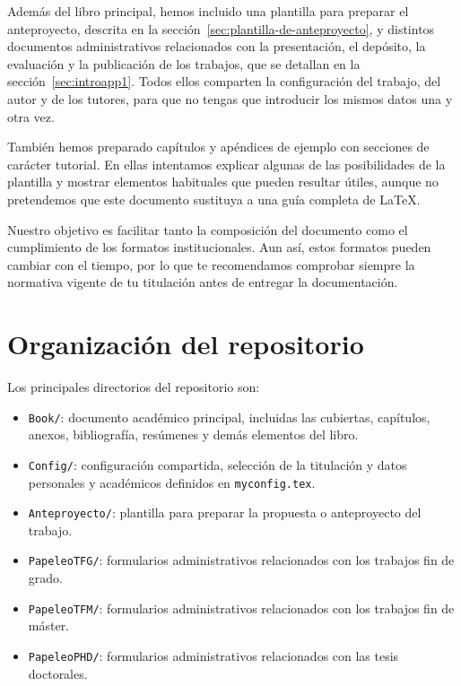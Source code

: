 Además del libro principal, hemos incluido una plantilla para preparar el anteproyecto, descrita en la sección~\ref{sec:plantilla-de-anteproyecto}, y distintos documentos administrativos relacionados con la presentación, el depósito, la evaluación y la publicación de los trabajos, que se detallan en la sección~\ref{sec:introapp1}. Todos ellos comparten la configuración del trabajo, del autor y de los tutores, para que no tengas que introducir los mismos datos una y otra vez.

También hemos preparado capítulos y apéndices de ejemplo con secciones de carácter tutorial. En ellas intentamos explicar algunas de las posibilidades de la plantilla y mostrar elementos habituales que pueden resultar útiles, aunque no pretendemos que este documento sustituya a una guía completa de \LaTeX{}.

Nuestro objetivo es facilitar tanto la composición del documento como el cumplimiento de los formatos institucionales. Aun así, estos formatos pueden cambiar con el tiempo, por lo que te recomendamos comprobar siempre la normativa vigente de tu titulación antes de entregar la documentación.

\section{Organización del repositorio}
\label{sec:organizacion-repositorio}

Los principales directorios del repositorio son:

\begin{itemize}
  \item \texttt{Book/}: documento académico principal, incluidas las cubiertas, capítulos, anexos, bibliografía, resúmenes y demás elementos del libro.
  \item \texttt{Config/}: configuración compartida, selección de la titulación y datos personales y académicos definidos en \texttt{myconfig.tex}.
  \item \texttt{Anteproyecto/}: plantilla para preparar la propuesta o anteproyecto del trabajo.
  \item \texttt{PapeleoTFG/}: formularios administrativos relacionados con los trabajos fin de grado.
  \item \texttt{PapeleoTFM/}: formularios administrativos relacionados con los trabajos fin de máster.
  \item \texttt{PapeleoPHD/}: formularios administrativos relacionados con las tesis doctorales.
\end{itemize}

